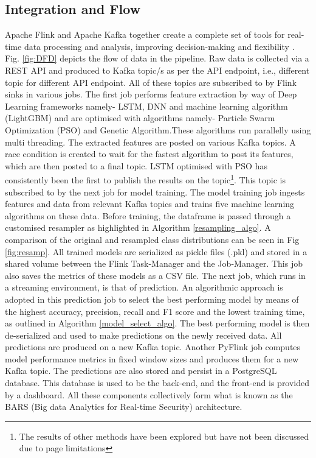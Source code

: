\documentclass[runningheads]{llncs}
\begin{document}
\subsection{Integration and Flow}
Apache Flink and Apache Kafka together create a complete set of tools for real-time data processing and analysis, improving decision-making and flexibility \cite{b16}.
Fig. \ref{fig:DFD} depicts the flow of data in the pipeline.
Raw data is collected via a REST API and produced to Kafka topic/s as per the API endpoint, i.e., different topic for different API endpoint. All of these topics are subscribed to by Flink sinks in various jobs. The first job performs feature extraction by way of Deep Learning frameworks namely- LSTM, DNN and machine learning algorithm (LightGBM) and are optimised with  algorithms namely- Particle Swarm Optimization (PSO) and Genetic Algorithm.These algorithms run parallelly using multi threading. The extracted features are posted on various Kafka topics. A race condition is created to wait for the fastest algorithm to post its features, which are then posted to a final topic. LSTM optimised with PSO has consistently been the first to publish the results on the topic\footnote{The results of other methods have been explored but have not been discussed due to page limitations}. This topic is subscribed to by the next job for model training. The model training job ingests features and data from relevant Kafka topics and trains five machine learning algorithms on these data. Before training, the dataframe is passed through a customised resampler as highlighted in Algorithm \ref{resampling_algo}. A comparison of the original and resampled class distributions can be seen in Fig \ref{fig:resamp}. All trained models are serialized as pickle files (.pkl) and stored in a shared volume between the Flink Task-Manager and the Job-Manager. This job also saves the metrics of these models as a CSV file. The next job, which runs in a streaming environment, is that of prediction. An algorithmic approach is adopted in this prediction job to select the best performing model by means of the highest accuracy, precision, recall and F1 score and the lowest training time, as outlined in Algorithm \ref{model_select_algo}. The best performing model is then de-serialized and used to make predictions on the newly received data. All predictions are produced on a new Kafka topic. Another PyFlink job computes model performance metrics in fixed window sizes and produces them for a new Kafka topic. The predictions are also stored and persist in a PostgreSQL database. This database is used to be the back-end, and the front-end is provided by a dashboard. All these components collectively form what is known as the BARS (Big data Analytics for Real-time Security) architecture.
\end{document}
